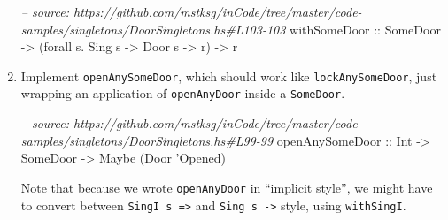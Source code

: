 \documentclass[]{article}
\newenvironment{Shaded}{}{}
\newcommand{\DataTypeTok}[1]{\textcolor[rgb]{0.56,0.13,0.00}{#1}}
\newcommand{\CharTok}[1]{\textcolor[rgb]{0.25,0.44,0.63}{#1}}
\newcommand{\CommentTok}[1]{\textcolor[rgb]{0.38,0.63,0.69}{\textit{#1}}}
\newcommand{\OtherTok}[1]{\textcolor[rgb]{0.00,0.44,0.13}{#1}}
\newcommand{\FunctionTok}[1]{\textcolor[rgb]{0.02,0.16,0.49}{#1}}
\newcommand{\NormalTok}[1]{#1}
\begin{document}
\begin{enumerate}
\begin{Shaded}
\begin{Highlighting}[]
\CommentTok{-- source: https://github.com/mstksg/inCode/tree/master/code-samples/singletons/DoorSingletons.hs#L103-103}
\OtherTok{withSomeDoor ::} \DataTypeTok{SomeDoor} \OtherTok{->}\NormalTok{ (forall s}\FunctionTok{.} \DataTypeTok{Sing}\NormalTok{ s }\OtherTok{->} \DataTypeTok{Door}\NormalTok{ s }\OtherTok{->}\NormalTok{ r) }\OtherTok{->}\NormalTok{ r}
\end{Highlighting}
\end{Shaded}
\item
  Implement \texttt{openAnySomeDoor}, which should work like
  \texttt{lockAnySomeDoor}, just wrapping an application of \texttt{openAnyDoor}
  inside a \texttt{SomeDoor}.

\begin{Shaded}
\begin{Highlighting}[]
\CommentTok{-- source: https://github.com/mstksg/inCode/tree/master/code-samples/singletons/DoorSingletons.hs#L99-99}
\OtherTok{openAnySomeDoor ::} \DataTypeTok{Int} \OtherTok{->} \DataTypeTok{SomeDoor} \OtherTok{->} \DataTypeTok{Maybe}\NormalTok{ (}\DataTypeTok{Door} \CharTok{'Opened)}
\end{Highlighting}
\end{Shaded}

  Note that because we wrote \texttt{openAnyDoor} in ``implicit style'', we
  might have to convert between \texttt{SingI\ s\ =\textgreater{}} and
  \texttt{Sing\ s\ -\textgreater{}} style, using \texttt{withSingI}.
\end{enumerate}
\end{document}
